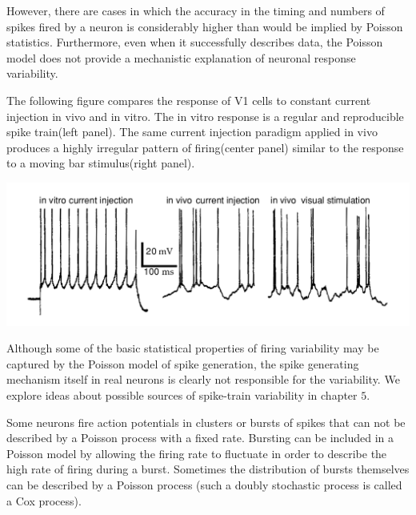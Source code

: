 \begin{rem}
    However,  there are cases in which the accuracy in the timing and numbers of spikes fired by a neuron is considerably higher than would be implied by Poisson statistics. 
    Furthermore,  even when it successfully describes data,  the Poisson model does not provide a mechanistic explanation of neuronal response variability.
\end{rem}

\begin{exm}
    The following figure compares the response of V1 cells to constant current injection in vivo and in vitro. The in vitro response is a regular and reproducible spike train(left panel). The same current injection paradigm applied in vivo produces a highly irregular pattern of firing(center panel) similar to the response to a moving bar stimulus(right panel).
\end{exm}

\begin{center}
    \label{fig:1.17}    
    \includegraphics[scale = 0.25]{png/Figure1-17.png}\\
\end{center}
Although some of the basic statistical properties of firing variability may be captured by the Poisson model of spike generation,  the spike generating mechanism itself in real neurons is clearly not responsible for the variability. We explore ideas about possible sources of spike-train variability in chapter $5$.

\begin{rem}
    Some neurons fire action potentials in clusters or bursts of spikes that can not be described by a Poisson process with a fixed rate. Bursting can be included in a Poisson model by allowing the firing rate to fluctuate in order to describe the high rate of firing during a burst. Sometimes the distribution of bursts themselves can be described by a Poisson process (such a doubly stochastic process is called a Cox process).    
\end{rem}





